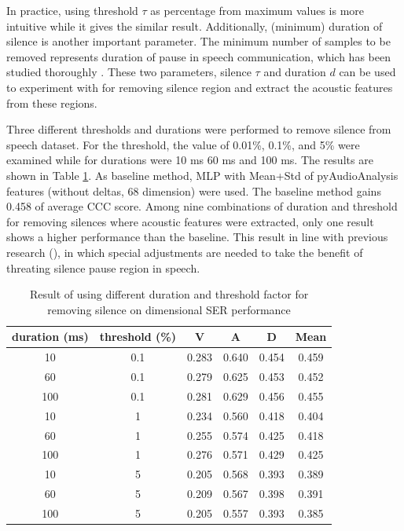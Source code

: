 In practice, using threshold $\tau$ as percentage from maximum values is more
intuitive while it gives the similar result. Additionally, (minimum) duration of
silence is another important parameter. The minimum number of samples to be
removed represents duration of pause in speech communication, which has been
studied thoroughly \cite{Campione2002}. These two parameters, silence $\tau$
and duration $d$ can be used to experiment with for removing silence region and 
extract the acoustic features from these regions.

Three different thresholds and durations were performed to remove silence from
speech dataset. For the threshold, the value of 0.01\%, 0.1\%, and 5\% were
examined while for durations were 10 ms 60 ms and 100 ms. The results are shown
in Table \ref{tab:sil_remove}. As baseline method, MLP with Mean+Std of
pyAudioAnalysis features (without deltas, 68 dimension) were used. The baseline
method gains 0.458 of average CCC score. Among nine combinations of duration and
threshold for removing silences where acoustic features were extracted, only
one result shows a higher performance than the baseline. This result in line
with previous research (\cite{Atmaja2019, Tian2015a, Aguilar2020,Fayek2017}), in
which special adjustments are needed to take the benefit of threating silence
pause region in speech.

\begin{table}
  \caption{Result of using different duration and threshold factor for
  removing silence on dimensional SER performance}
  \begin{center}
  \begin{tabular}{c | c | c c c c}
    \hline
    duration (ms)   & threshold (\%) &  V & A & D & Mean \\
    \hline \hline
    10	& 0.1	& 0.283	& 0.640	& 0.454	& 0.459 \\
    60	& 0.1	& 0.279	& 0.625	& 0.453	& 0.452 \\
    100	& 0.1	& 0.281	& 0.629	& 0.456	& 0.455 \\
    10	& 1	& 0.234	& 0.560	& 0.418	& 0.404 \\
    60	& 1	& 0.255	& 0.574	& 0.425	& 0.418 \\
    100	& 1	& 0.276	& 0.571	& 0.429	& 0.425 \\
    10	& 5	& 0.205	& 0.568	& 0.393	& 0.389 \\
    60	& 5	& 0.209	& 0.567	& 0.398	& 0.391 \\
    100	& 5	& 0.205	& 0.557	& 0.393	& 0.385 \\
    \hline
  \end{tabular}
  \label{tab:sil_remove}
  \end{center}
\end{table}

